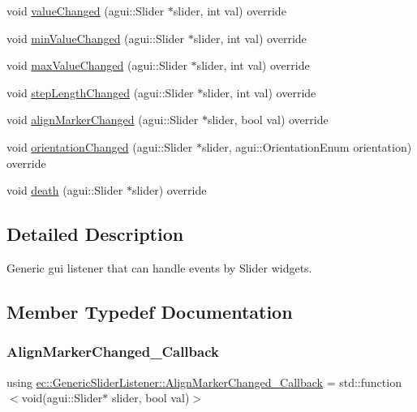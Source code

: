 \begin{DoxyCompactItemize}
\item 
void \mbox{\hyperlink{classec_1_1_generic_slider_listener_a884faf715962f7785174edec063aa145}{value\+Changed}} (agui\+::\+Slider $\ast$slider, int val) override
\item 
void \mbox{\hyperlink{classec_1_1_generic_slider_listener_a1dd803d6b575a549261b9fe04a9da279}{min\+Value\+Changed}} (agui\+::\+Slider $\ast$slider, int val) override
\item 
void \mbox{\hyperlink{classec_1_1_generic_slider_listener_a91d4e65dd9128321b891e01cced50237}{max\+Value\+Changed}} (agui\+::\+Slider $\ast$slider, int val) override
\item 
void \mbox{\hyperlink{classec_1_1_generic_slider_listener_af6958b779d400924196cff0c0d74ff76}{step\+Length\+Changed}} (agui\+::\+Slider $\ast$slider, int val) override
\item 
void \mbox{\hyperlink{classec_1_1_generic_slider_listener_a78e74140590b1719b5c529cdfc2ec425}{align\+Marker\+Changed}} (agui\+::\+Slider $\ast$slider, bool val) override
\item 
void \mbox{\hyperlink{classec_1_1_generic_slider_listener_abd487c83f6c8ff029b474d1c28e743c2}{orientation\+Changed}} (agui\+::\+Slider $\ast$slider, agui\+::\+Orientation\+Enum orientation) override
\item 
void \mbox{\hyperlink{classec_1_1_generic_slider_listener_aceaad6f17199becb59205d1ac57f9a67}{death}} (agui\+::\+Slider $\ast$slider) override
\end{DoxyCompactItemize}


\subsection{Detailed Description}
Generic gui listener that can handle events by Slider widgets. 

\subsection{Member Typedef Documentation}
\mbox{\label{classec_1_1_generic_slider_listener_a0b14e921e56b7dfc0a23af21f9921e0c}} 
\subsubsection{\texorpdfstring{Align\+Marker\+Changed\+\_\+\+Callback}{AlignMarkerChanged\_Callback}}
{\footnotesize\ttfamily using \mbox{\hyperlink{classec_1_1_generic_slider_listener_a0b14e921e56b7dfc0a23af21f9921e0c}{ec\+::\+Generic\+Slider\+Listener\+::\+Align\+Marker\+Changed\+\_\+\+Callback}} =  std\+::function$<$void(agui\+::\+Slider$\ast$ slider, bool val)$>$}


